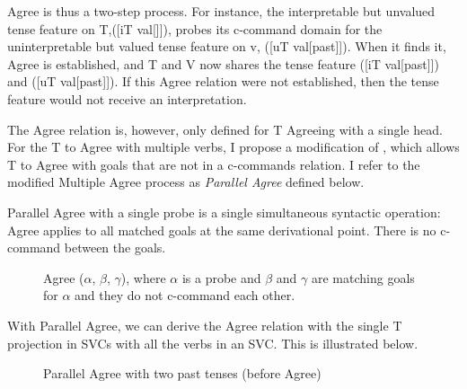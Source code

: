 \documentclass[output=paper,colorlinks,citecolor=brown]{langscibook}
\begin{document}
Agree is thus a two-step process. For instance, the interpretable but unvalued tense feature on T,([iT val[]]), probes its c-command domain for the uninterpretable but valued tense feature on v, ([uT val[past]]). When it finds it, Agree is established, and T and V now shares the tense feature ([iT val[past]]) and ([uT val[past]]). If this Agree relation were not established, then the tense feature would not receive an interpretation. 

The Agree relation is, however, only defined for T Agreeing with a single head. For the T to Agree with multiple verbs, I propose a modification of  \citet{Hiraiwa2001}, which allows T to Agree with goals that are not in a c-commands relation. I refer to the modified Multiple Agree process as \textit{Parallel Agree} defined below.

\ea \label{ex25}
Parallel Agree with a single probe is a single simultaneous syntactic operation: Agree applies to all matched goals at the same derivational point. There is no c-command between the goals.
\z

\begin{figure}
\caption{Agree ($\alpha$, $\beta$, $\gamma$), where $\alpha$ is a probe and $\beta$ and  $\gamma$ are matching goals for $\alpha$ and they do not c-command each other.}
\end{figure}

With Parallel Agree, we can derive the Agree relation with the single T projection in SVCs with all the verbs in an SVC. This is illustrated below. 
 
\begin{figure}[p]
\caption{\label{ex35a}Parallel Agree with two past tenses (before Agree)}
\end{figure}
\end{document}
